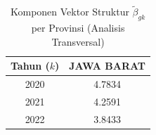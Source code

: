 \begin{table}[H]
\centering
\small
\caption{Komponen Vektor Struktur $\tilde{\beta}_{gk}$ per Provinsi (Analisis Transversal)} \label{tab:sample1beta_provinsi}
\begin{tabular}{|c|c|}
\hline
\textbf{Tahun ($k$)} & \textbf{JAWA BARAT} \\
\hline
2020 & 4.7834 \\
2021 & 4.2591 \\
2022 & 3.8433 \\
\hline
\end{tabular}
\end{table}